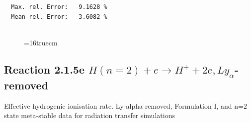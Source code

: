 \documentclass[12pt,dvipdfmx]{article}
\begin{document}
\begin{small}
\begin{verbatim}
  Max. rel. Error:   9.1628 %
  Mean rel. Error:   3.6082 %


\end{verbatim}\end{small}
\begin{figure} \label{2.1.5d}
\epsfxsize=16truecm
\end{figure}
\newpage
\subsection{
Reaction 2.1.5e  $H(n=2) + e \rightarrow H^+ + 2e, Ly_\alpha$-removed
}


   Effective hydrogenic ionisation rate.
   Ly-alpha removed, Formulation I, and n=2 state meta-stable
   data for radiation transfer simulations
\end{document}
